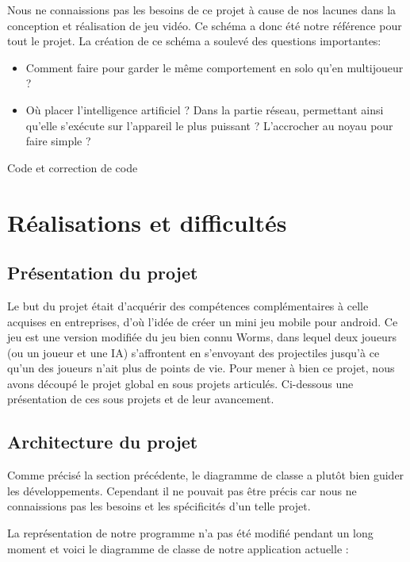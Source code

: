 \documentclass{report}
\begin{document}
Nous ne connaissions pas les besoins de ce projet à cause de nos lacunes dans la conception et réalisation de jeu vidéo. Ce schéma a donc été notre référence pour tout le projet. La création de ce schéma a soulevé des questions importantes: 

\begin{itemize}
\item Comment faire pour garder le même comportement en solo qu’en multijoueur ?
\item Où placer l’intelligence artificiel ? Dans la partie réseau, permettant ainsi qu’elle s'exécute sur l’appareil le plus puissant ? L’accrocher au noyau pour faire simple ?
\end{itemize}

Code et correction de code

\section{Réalisations et difficultés}

\subsection{Présentation du projet}

Le but du projet était d'acquérir des compétences complémentaires à celle acquises en entreprises, d’où l’idée de créer un mini jeu mobile pour android. Ce jeu est une version modifiée du jeu bien connu Worms, dans lequel deux joueurs (ou un joueur et une IA) s’affrontent en s’envoyant des projectiles jusqu’à ce qu’un des joueurs n’ait plus de points de vie.
Pour mener à bien ce projet, nous avons découpé le projet global en sous projets articulés. Ci-dessous une présentation de ces sous projets et de leur avancement.

\subsection{Architecture du projet}

Comme précisé la section précédente, le diagramme de classe a plutôt bien guider les développements. Cependant il ne pouvait pas être précis car nous ne connaissions pas les besoins et les spécificités d’un telle projet.

La représentation de notre programme n’a pas été modifié pendant un long moment et voici le diagramme de classe de notre application actuelle :
\end{document}
